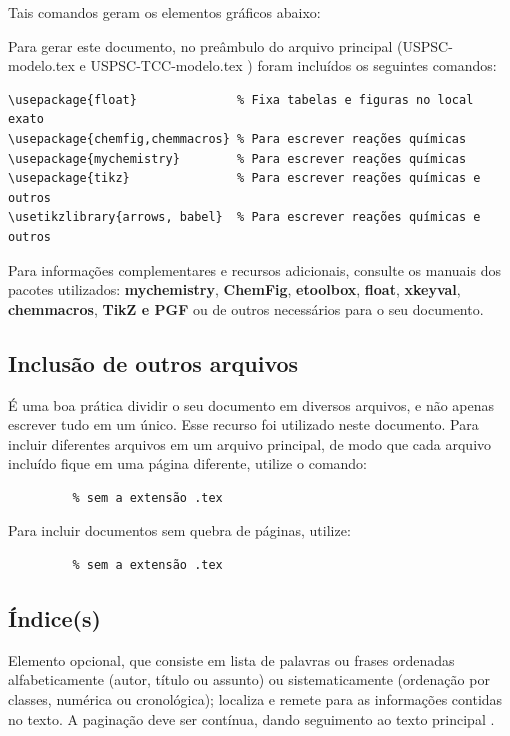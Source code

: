 Tais comandos geram os elementos gráficos abaixo:



Para gerar este documento, no preâmbulo do arquivo principal (USPSC-modelo.tex e USPSC-TCC-modelo.tex ) foram incluídos os seguintes comandos:
\begin{verbatim}
\usepackage{float} 				% Fixa tabelas e figuras no local exato
\usepackage{chemfig,chemmacros} % Para escrever reações químicas
\usepackage{mychemistry}        % Para escrever reações químicas
\usepackage{tikz}               % Para escrever reações químicas e outros
\usetikzlibrary{arrows, babel}	% Para escrever reações químicas e outros
\end{verbatim}

Para informações complementares e recursos adicionais, consulte os manuais dos pacotes utilizados:  \textbf{mychemistry}\cite{mychemistryPac}, \textbf{ChemFig}\cite{ChemFigPac}, \textbf{etoolbox}\cite{etoolboxPack}, \textbf{float}\cite{floatPac}, \textbf{xkeyval}\cite{xkeyvalPac}, \textbf{chemmacros}\cite{chemmacrosPac}, \textbf{TikZ e PGF}\cite{TikZPac} ou de outros necessários para o seu documento.


\subsection{Inclusão de outros arquivos}\label{sec-include}

É uma boa prática dividir o seu documento em diversos arquivos, e não
apenas escrever tudo em um único. Esse recurso foi utilizado neste
documento. Para incluir diferentes arquivos em um arquivo principal,
de modo que cada arquivo incluído fique em uma página diferente, utilize o
comando:

\begin{verbatim}
         % sem a extensão .tex
\end{verbatim}

Para incluir documentos sem quebra de páginas, utilize:

\begin{verbatim}
         % sem a extensão .tex
\end{verbatim}
\subsection{Índice(s)}
Elemento  opcional,  que  consiste  em  lista  de  palavras  ou  frases  ordenadas alfabeticamente (autor, título ou assunto) ou sistematicamente (ordenação por classes, numérica ou cronológica); localiza e remete para as informações contidas no texto. A paginação deve ser contínua, dando seguimento ao texto principal \cite{aguia2020}.

